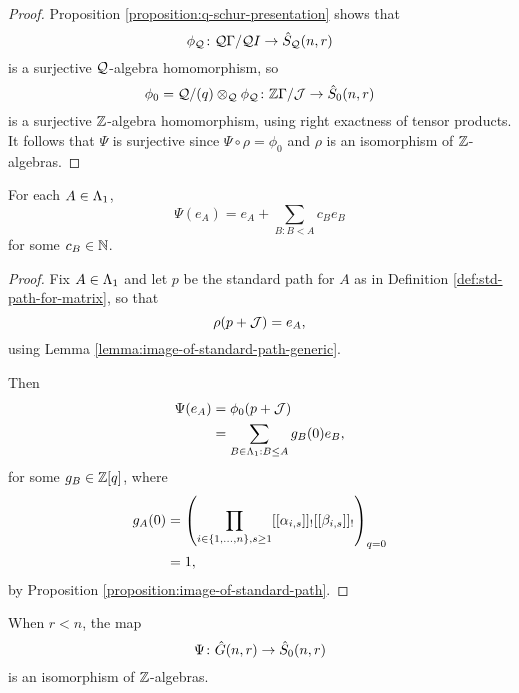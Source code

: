\documentclass[a4paper, 11pt]{report}
\begin{document}
\begin{proof}
Proposition \ref{proposition:q-schur-presentation} shows that
\begin{equation*}
\phi_{\mathcal{Q}}\colon \mathcal{Q}\Gamma/{\mathcal{Q}I}\to\hat{S}_{\mathcal{Q}}(n,r)
\end{equation*}
is a surjective $\mathcal{Q}$-algebra homomorphism, so
\begin{equation*}
\phi_0 = \mathcal{Q}/{(q)}\otimes_{\mathcal{Q}}\phi_{\mathcal{Q}} \colon \mathbb{Z}\Gamma/{\mathcal{J}}\to\hat{S}_0(n,r)
\end{equation*}
is a surjective $\mathbb{Z}$-algebra homomorphism, using right exactness of tensor products. It follows that $\Psi$ is surjective since $\Psi\circ\rho=\phi_0$ and $\rho$ is an isomorphism of $\mathbb{Z}$-algebras.
\end{proof}

\begin{lemma}\label{lemma:transfer-map-leading-term}
For each $A\in\Lambda_1{}$,
\begin{equation*}
\Psi(e_A) = e_A +\sum_{B:B<A} c_B e_B
\end{equation*}
for some $c_B\in\mathbb{N}$.
\end{lemma}

\begin{proof}
Fix $A\in\Lambda_1{}$ and let $p$ be the standard path for $A$ as in Definition \ref{def:std-path-for-matrix}, so that
\begin{equation*}
\rho(p+\mathcal{J})=e_A,
\end{equation*}
using Lemma \ref{lemma:image-of-standard-path-generic}.

Then
\begin{align*}
\Psi(e_A)
&= \phi_0(p+\mathcal{J})\\
&= \sum_{B\in\Lambda_1{}:B\le A} g_B(0) e_B,
\end{align*}
for some $g_B\in\mathbb{Z}[q]$, where
\begin{align*}
g_A(0)
&= \left(\prod_{i\in\{1,\ldots,n\},s\geq 1} [[\alpha_{i,s}]]_![[\beta_{i,s}]]_!\right)_{q=0}\\
&= 1,
\end{align*}
by Proposition \ref{proposition:image-of-standard-path}.
\end{proof}

\begin{theorem}
When $r<n$, the map
\begin{equation*}
\Psi\colon\hat{G}(n,r)\to\hat{S}_0(n,r)
\end{equation*}
is an isomorphism of $\mathbb{Z}$-algebras.
\end{theorem}
\end{document}
